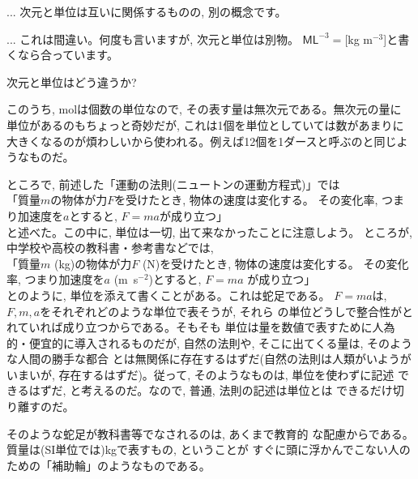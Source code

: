 \begin{freqmiss}{\small{} ... 次元と単位は互いに関係するものの, 
別の概念です}。\end{freqmiss}

\begin{freqmiss}{\small{} ... 
これは間違い。何度も言いますが, 次元と単位は別物。
$\mathsf{M}\mathsf{L}^{-3}=$[kg m$^{-3}$]と書くなら合っています。}\end{freqmiss}

\begin{q}\label{q:diff_dim_unit} 次元と単位はどう違うか?\end{q}




このうち, molは個数の単位なので, その表す量は無次元である。無次元の量に
単位があるのもちょっと奇妙だが, これは1個を単位としていては数があまりに
大きくなるのが煩わしいから使われる。例えば12個を1ダースと呼ぶのと同じようなものだ。



ところで, 前述した「運動の法則(ニュートンの運動方程式)」では\\
「質量$m$の物体が力$F$を受けたとき, 物体の速度は変化する。
その変化率, つまり加速度を$a$とすると, $F=ma$が成り立つ」\\
と述べた。この中に, 単位は一切, 出て来なかったことに注意しよう。
ところが, 中学校や高校の教科書・参考書などでは, \\
「質量$m$ (kg)の物体が力$F$ (N)を受けたとき, 物体の速度は変化する。
その変化率, つまり加速度を$a$ (m~s$^{-2}$)とすると, $F=ma$
が成り立つ」\\
とのように, 単位を添えて書くことがある。これは蛇足である。
$F=ma$は, $F, m, a$をそれぞれどのような単位で表そうが, それら
の単位どうしで整合性がとれていれば成り立つからである。そもそも
単位は量を数値で表すために人為的・便宜的に導入されるものだが, 
自然の法則や, そこに出てくる量は, そのような人間の勝手な都合
とは無関係に存在するはずだ(自然の法則は人類がいようがいまいが, 
存在するはずだ)。従って, そのようなものは, 単位を使わずに記述
できるはずだ, と考えるのだ。なので, 普通, 法則の記述は単位とは
できるだけ切り離すのだ。

そのような蛇足が教科書等でなされるのは, あくまで教育的
な配慮からである。質量は(SI単位では)kgで表すもの, ということが
すぐに頭に浮かんでこない人のための「補助輪」のようなものである。\\

